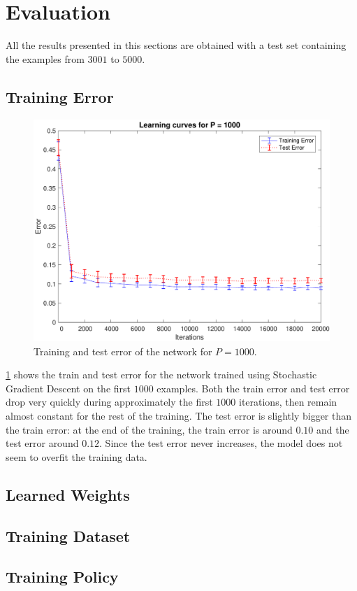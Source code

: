 \section{Evaluation}
\label{sec:evaluation}

All the results presented in this sections are obtained with a test set containing the examples from $3001$ to $5000$.

\subsection{Training Error}
\begin{figure}[t]
	\centering
	\includegraphics[width=\columnwidth]{figures/error}
    \caption{Training and test error of the network for $P = 1000$.}
	\label{fig:training_error}
\end{figure}

\cref{fig:training_error} shows the train and test error for the network trained using Stochastic Gradient Descent on the first $1000$ examples.
Both the train error and test error drop very quickly during approximately the first $1000$ iterations, then remain almost constant for the rest of the training.
The test error is slightly bigger than the train error:
at the end of the training, the train error is around $0.10$ and the test error around $0.12$.
Since the test error never increases, the model does not seem to overfit the training data.

\subsection{Learned Weights}

\subsection{Training Dataset}

\subsection{Training Policy}
